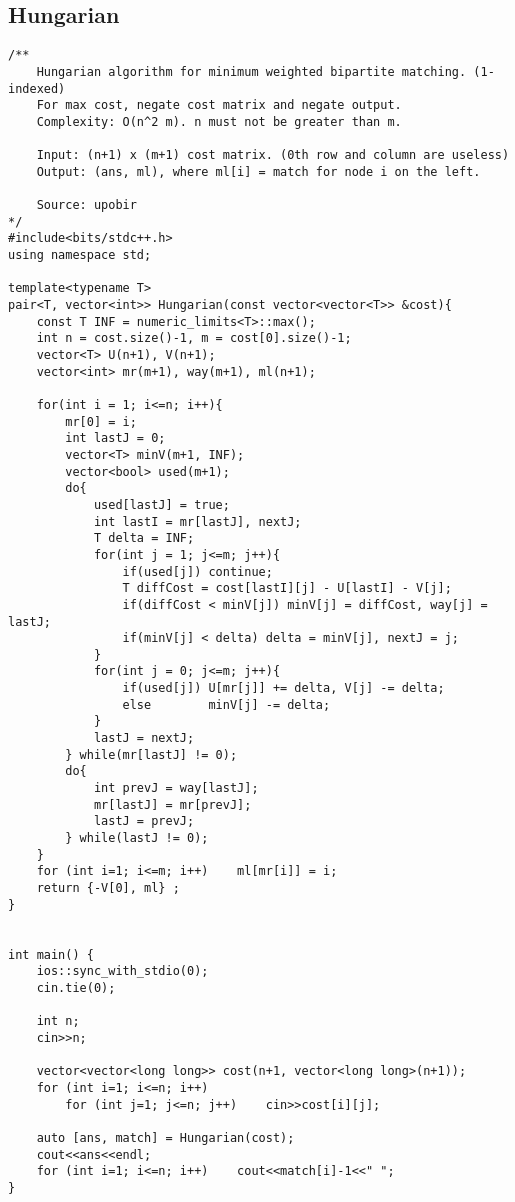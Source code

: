 \documentclass[FSZ,a4paper,onesided]{article}
\begin{document}
\begin{multicols*}{\COLS}
\subsection{Hungarian}
\begin{lstlisting}
/**
    Hungarian algorithm for minimum weighted bipartite matching. (1-indexed)
    For max cost, negate cost matrix and negate output.
    Complexity: O(n^2 m). n must not be greater than m.

    Input: (n+1) x (m+1) cost matrix. (0th row and column are useless)
    Output: (ans, ml), where ml[i] = match for node i on the left.

    Source: upobir
*/
#include<bits/stdc++.h>
using namespace std;

template<typename T>
pair<T, vector<int>> Hungarian(const vector<vector<T>> &cost){
    const T INF = numeric_limits<T>::max();
    int n = cost.size()-1, m = cost[0].size()-1;
    vector<T> U(n+1), V(n+1);
    vector<int> mr(m+1), way(m+1), ml(n+1);

    for(int i = 1; i<=n; i++){
        mr[0] = i;
        int lastJ = 0;
        vector<T> minV(m+1, INF);
        vector<bool> used(m+1);
        do{
            used[lastJ] = true;
            int lastI = mr[lastJ], nextJ;
            T delta = INF;
            for(int j = 1; j<=m; j++){
                if(used[j]) continue;
                T diffCost = cost[lastI][j] - U[lastI] - V[j];
                if(diffCost < minV[j]) minV[j] = diffCost, way[j] = lastJ;
                if(minV[j] < delta) delta = minV[j], nextJ = j;
            }
            for(int j = 0; j<=m; j++){
                if(used[j]) U[mr[j]] += delta, V[j] -= delta;
                else        minV[j] -= delta;
            }
            lastJ = nextJ;
        } while(mr[lastJ] != 0);
        do{
            int prevJ = way[lastJ];
            mr[lastJ] = mr[prevJ];
            lastJ = prevJ;
        } while(lastJ != 0);
    }
    for (int i=1; i<=m; i++)    ml[mr[i]] = i;
    return {-V[0], ml} ;
}


int main() {
    ios::sync_with_stdio(0);
    cin.tie(0);

    int n;
    cin>>n;

    vector<vector<long long>> cost(n+1, vector<long long>(n+1));
    for (int i=1; i<=n; i++)
        for (int j=1; j<=n; j++)    cin>>cost[i][j];

    auto [ans, match] = Hungarian(cost);
    cout<<ans<<endl;
    for (int i=1; i<=n; i++)    cout<<match[i]-1<<" ";
}
\end{lstlisting}

\end{multicols*}
\end{document}
